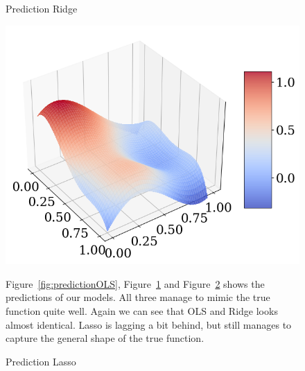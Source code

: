 \documentclass[twoside,11pt]{report}
\begin{document}
\begin{figure}[h]
\begin{minipage}[!t]{.48\linewidth}
\begin{center}
        \caption{Prediction Ridge}\label{fig:predictionRidge}
    \end{center}
\end{minipage}
\end{figure}
\begin{figure}[h]
\begin{minipage}[!t]{.48\linewidth}
    \begin{center}
        \includegraphics[width=1.0\textwidth]{../runsAndAdditions/predictionLasso.png}
        \caption{Prediction Lasso}\label{fig:predictionLasso}
\end{center}
\end{minipage}
\hspace{4mm}
\begin{minipage}[!t]{.48\linewidth}
    Figure~\ref{fig:predictionOLS}, Figure~\ref{fig:predictionRidge} and Figure~\ref{fig:predictionLasso} shows the 
    predictions of our models. All three manage to mimic the true function quite well. Again we can see that OLS and Ridge
    looks almost identical. Lasso is lagging a bit behind, but still manages to capture the general shape of the true function.
\end{minipage}
\end{figure}
\end{document}
